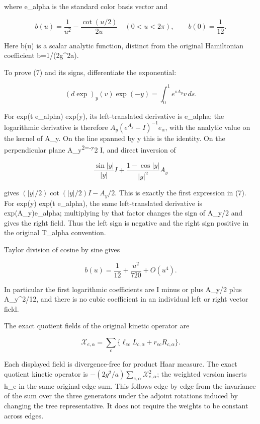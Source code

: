 \documentclass[
  11pt,
]{article}
\begin{document}
where e\_alpha is the standard color basis vector and

\[
 b(u)=\frac1{u^2}-\frac{\cot(u/2)}{2u}\quad(0<u<2\pi),
 \qquad b(0)=\frac1{12}.                                   \tag{8}
\]

Here b(u) is a scalar analytic function, distinct from the original
Hamiltonian coefficient b=1/(2g\^{}2a).

To prove (7) and its signs, differentiate the exponential:

\[
 (d\exp)_y(v)\exp(-y)=\int_0^1e^{sA_y}v\,ds.
\]

For exp(t e\_alpha) exp(y), its left-translated derivative is e\_alpha;
the logarithmic derivative is therefore \(A_y(e^{A_y}-I)^{-1}e_\alpha\),
with the analytic value on the kernel of A\_y. On the line spanned by y
this is the identity. On the perpendicular plane
A\_y\textsuperscript{2=-\textbar y\textbar{}}2 I, and direct inversion
of

\[
 \frac{\sin |y|}{|y|}I+
           \frac{1-\cos |y|}{|y|^2}A_y
\]

gives \((|y|/2)\cot(|y|/2)I-A_y/2\). This is exactly the first
expression in (7). For exp(y) exp(t e\_alpha), the same left-translated
derivative is exp(A\_y)e\_alpha; multiplying by that factor changes the
sign of A\_y/2 and gives the right field. Thus the left sign is negative
and the right sign positive in the original T\_alpha convention.

Taylor division of cosine by sine gives

\[
 b(u)=\frac1{12}+\frac{u^2}{720}+O(u^4).                    \tag{9}
\]

In particular the first logarithmic coefficients are I minus or plus
A\_y/2 plus A\_y\^{}2/12, and there is no cubic coefficient in an
individual left or right vector field.

The exact quotient fields of the original kinetic operator are

\[
 \mathcal X_{e,\alpha}
 =\sum_c\{\ell_{ec}L_{c,\alpha}+r_{ec}R_{c,\alpha}\}.
                                                                  \tag{10}
\]

Each displayed field is divergence-free for product Haar measure. The
exact quotient kinetic operator is
\(-(2g^2/a)\sum_{e,\alpha}\mathcal X_{e,\alpha}^2\); the weighted
version inserts h\_e in the same original-edge sum. This follows edge by
edge from the invariance of the sum over the three generators under the
adjoint rotations induced by changing the tree representative. It does
not require the weights to be constant across edges.
\end{document}
